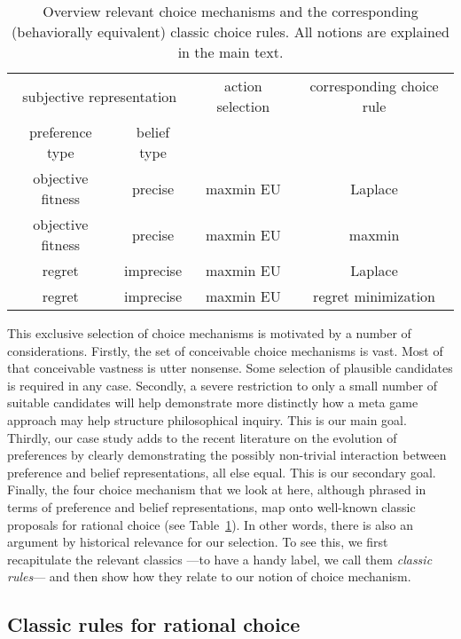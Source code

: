 \documentclass[fleqn,reqno,11pt]{article}
\begin{document}
\begin{table}[t]
  \centering
  \begin{tabular}{cccc}
    \multicolumn{2}{c}{subjective representation} & action selection & corresponding choice
    rule \\  \cmidrule(r){1-2}
    preference type & belief type  \\ \midrule
    objective fitness & precise & maxmin EU &  Laplace \\
    objective fitness & precise & maxmin EU & maxmin \\ 
    regret & imprecise & maxmin EU & Laplace \\
    regret & imprecise & maxmin EU & regret minimization \\ 
  \end{tabular}
  \caption{Overview relevant choice mechanisms and the corresponding (behaviorally equivalent)
    classic choice rules. All notions are explained in the main text.}
  \label{tab:CMs}
\end{table}

This exclusive selection of choice mechanisms is motivated by a number of
considerations. Firstly, the set of conceivable choice mechanisms is vast. Most of that
conceivable vastness is utter nonsense. Some selection of plausible candidates is required in
any case. Secondly, a severe restriction to only a small number of suitable candidates will
help demonstrate more distinctly how a meta game approach may help structure philosophical
inquiry. This is our main goal. Thirdly, our case study adds to the recent literature on the
evolution of preferences by clearly demonstrating the possibly non-trivial interaction between
preference and belief representations, all else equal. This is our secondary goal. Finally, the
four choice mechanism that we look at here, although phrased in terms of preference and belief
representations, map onto well-known classic proposals for rational choice (see
Table~\ref{tab:CMs}). In other words, there is also an argument by historical relevance for our
selection. To see this, we first recapitulate the relevant classics ---to have a handy label,
we call them \emph{classic rules}--- and then show how they relate to our notion of choice
mechanism.

\subsection{Classic rules for rational choice} 
\label{sec:choice-rules}
\end{document}
